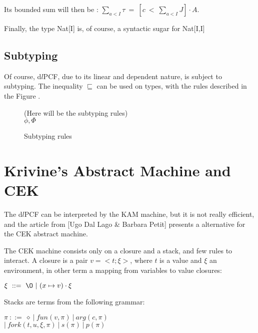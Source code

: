 \documentclass[a4paper,12pt]{report}
\begin{document}
Its bounded sum will then be : $\sum_{a<I} \tau ~=~ [c~<~\sum_{a<I}J] \cdot A$. 

Finally, the type Nat[I] is, of course, a syntactic sugar for Nat[I,I]

\subsection{Subtyping}

Of course, d$l$PCF, due to its linear and dependent nature, is subject to
subtyping. The inequality $\sqsubseteq$ can be used on types, with the rules
described in the Figure \label{subtyping}.

\begin{figure}
  (Here will be the subtyping rules) \\
  $\phi , \Phi$
  \caption{Subtyping rules}
  \label{subtyping}
\end{figure}

\section{Krivine's Abstract Machine and CEK}

The d$l$PCF can be interpreted by the KAM machine, but it is not really
efficient, and the article from [Ugo Dal Lago \& Barbara Petit] presents a
alternative for the CEK abstract machine.

The CEK machine consists only on a closure and a stack, and few rules to
interact. A closure is a pair $v =<t;\xi>$, where $t$ is a value and $\xi$
an environment, in other term a mapping from variables to value closures:

\begin{center}
  $\xi ~ ::=~\O~|~(x \mapsto v) \cdot \xi$
\end{center}

Stacks are terms from the following grammar:

\begin{center}
  $\pi~::=~\diamond~|~fun(v, \pi)~|~arg(c, \pi)$ \\
  $|~fork(t,u,\xi,\pi)~|~s(\pi)~|~p(\pi)$
\end{center}



\end{document}
